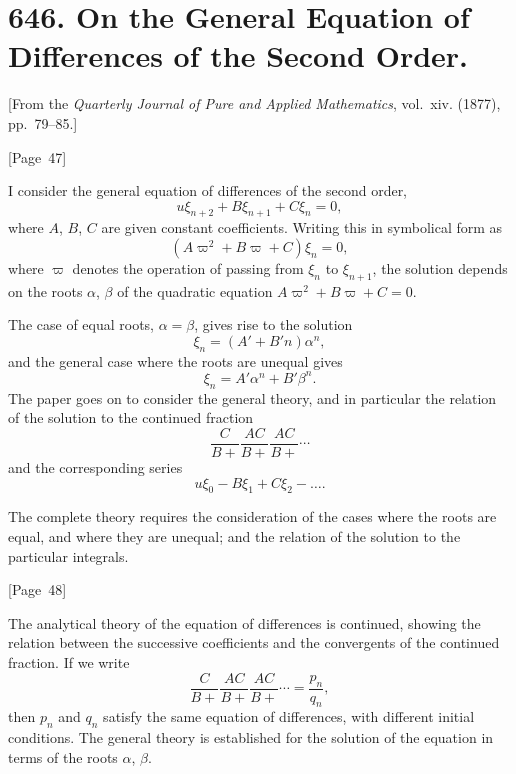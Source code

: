 \documentclass[11pt,a4paper]{book}
\begin{document}
\newpage
\section*{646. On the General Equation of Differences of the Second Order.}

[From the \textit{Quarterly Journal of Pure and Applied Mathematics},
vol.~xiv. (1877), pp.~79--85.]

\begin{center}
[Page~47]
\end{center}

I consider the general equation of differences of the second order,
\[
u \xi_{n+2} + B \xi_{n+1} + C \xi_n = 0,
\]
where $A$, $B$, $C$ are given constant coefficients. Writing this in
symbolical form as
\[
(A\varpi^2 + B\varpi + C)\xi_n = 0,
\]
where $\varpi$ denotes the operation of passing from $\xi_n$ to $\xi_{n+1}$,
the solution depends on the roots $\alpha$, $\beta$ of the quadratic
equation $A\varpi^2 + B\varpi + C = 0$.

The case of equal roots, $\alpha = \beta$, gives rise to the solution
\[
\xi_n = (A' + B'n)\alpha^n,
\]
and the general case where the roots are unequal gives
\[
\xi_n = A'\alpha^n + B'\beta^n.
\]
The paper goes on to consider the general theory, and in particular the
relation of the solution to the continued fraction
\[
\frac{C}{B+}\frac{AC}{B+}\frac{AC}{B+}\cdots
\]
and the corresponding series
\[
u \xi_0 - B\xi_1 + C\xi_2 - \dots.
\]

The complete theory requires the consideration of the cases where the
roots are equal, and where they are unequal; and the relation of the
solution to the particular integrals.

\begin{center}
[Page~48]
\end{center}

The analytical theory of the equation of differences is continued,
showing the relation between the successive coefficients and the
convergents of the continued fraction. If we write
\[
\frac{C}{B+}\frac{AC}{B+}\frac{AC}{B+}\cdots =
\frac{p_n}{q_n},
\]
then $p_n$ and $q_n$ satisfy the same equation of differences, with
different initial conditions. The general theory is established for
the solution of the equation in terms of the roots $\alpha$, $\beta$.
\end{document}
